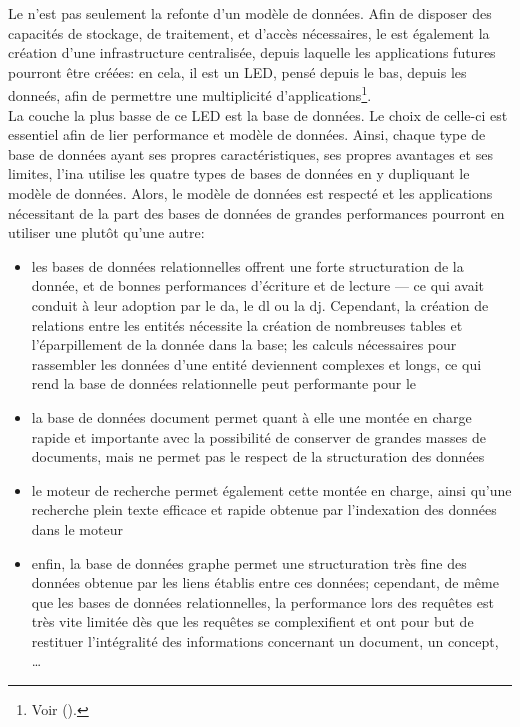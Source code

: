 Le \ldd n'est pas seulement la refonte d'un modèle de données. Afin de disposer des capacités de stockage, de traitement, et d'accès nécessaires, le \ldd est également la création d'une infrastructure centralisée, depuis laquelle les applications futures pourront être créées: en cela, il est un LED, pensé depuis le bas, depuis les donneés, afin de permettre une multiplicité d'applications\footnote{Voir  ().}.\\

La couche la plus basse de ce LED est la base de données. Le choix de celle-ci est essentiel afin de lier performance et modèle de données. Ainsi, chaque type de base de données ayant ses propres caractéristiques, ses propres avantages et ses limites, l'\ac{ina} utilise les quatre types de bases de données en y dupliquant le modèle de données. Alors, le modèle de données est respecté et les applications nécessitant de la part des bases de données de grandes performances pourront en utiliser une plutôt qu'une autre:
\begin{itemize}
	\item les bases de données relationnelles offrent une forte structuration de la donnée, et de bonnes performances d'écriture et de lecture --- ce qui avait conduit à leur adoption par le \ac{da}, le \ac{dl} ou la \ac{dj}. Cependant, la création de relations entre les entités nécessite la création de nombreuses tables et l'éparpillement de la donnée dans la base; les calculs nécessaires pour rassembler les données d'une entité deviennent complexes et longs, ce qui rend la base de données relationnelle peut performante pour le \ldd
	\item la base de données document permet quant à elle une montée en charge rapide et importante avec la possibilité de conserver de grandes masses de documents, mais ne permet pas le respect de la structuration des données
	\item le moteur de recherche permet également cette montée en charge, ainsi qu'une recherche plein texte efficace et rapide obtenue par l'indexation des données dans le moteur
	\item enfin, la base de données graphe permet une structuration très fine des données obtenue par les liens établis entre ces données; cependant, de même que les bases de données relationnelles, la performance lors des requêtes est très vite limitée dès que les requêtes se complexifient et ont pour but de restituer l'intégralité des informations concernant un document, un concept, \dots
\end{itemize}
\medskip


